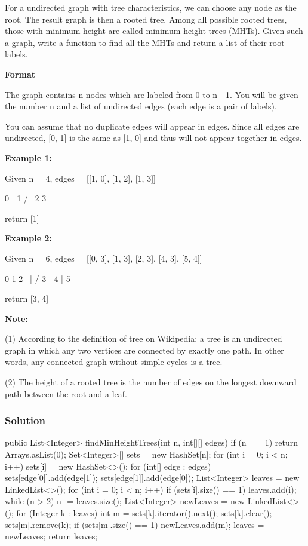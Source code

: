 For a undirected graph with tree characteristics, we can choose any node as the root. The result graph is then a rooted tree. Among all possible rooted trees, those with minimum height are called minimum height trees (MHTs). Given such a graph, write a function to find all the MHTs and return a list of their root labels.

\textbf{Format}

The graph contains n nodes which are labeled from 0 to n - 1. You will be given the number n and a list of undirected edges (each edge is a pair of labels).

You can assume that no duplicate edges will appear in edges. Since all edges are undirected, [0, 1] is the same as [1, 0] and thus will not appear together in edges.

\textbf{Example 1:}

Given n = 4, edges = [[1, 0], [1, 2], [1, 3]]
\begin{Code}
        0
        |
        1
       / \
      2   3
\end{Code}

return [1]

\textbf{Example 2:}

Given n = 6, edges = [[0, 3], [1, 3], [2, 3], [4, 3], [5, 4]]
\begin{Code}
     0  1  2
      \ | /
        3
        |
        4
        |
        5
\end{Code}

return [3, 4]

\textbf{Note:}

(1) According to the definition of tree on Wikipedia: a tree is an undirected graph in which any two vertices are connected by exactly one path. In other words, any connected graph without simple cycles is a tree.

(2) The height of a rooted tree is the number of edges on the longest downward path between the root and a leaf.

\newpage

\subsubsection{Solution}

\begin{Code}
public List<Integer> findMinHeightTrees(int n, int[][] edges) {
    if (n == 1) {
        return Arrays.asList(0);
    }
    Set<Integer>[] sets = new HashSet[n];
    for (int i = 0; i < n; i++) {
        sets[i] = new HashSet<>();
    }
    for (int[] edge : edges) {
        sets[edge[0]].add(edge[1]);
        sets[edge[1]].add(edge[0]);
    }
    List<Integer> leaves = new LinkedList<>();
    for (int i = 0; i < n; i++) {
        if (sets[i].size() == 1) {
            leaves.add(i);
        }
    }
    while (n > 2) {
        n -= leaves.size();
        List<Integer> newLeaves = new LinkedList<>();
        for (Integer k : leaves) {
            int m = sets[k].iterator().next();
            sets[k].clear();
            sets[m].remove(k);
            if (sets[m].size() == 1) {
                newLeaves.add(m);
            }
        }
        leaves = newLeaves;
    }
    return leaves;
}
\end{Code}

